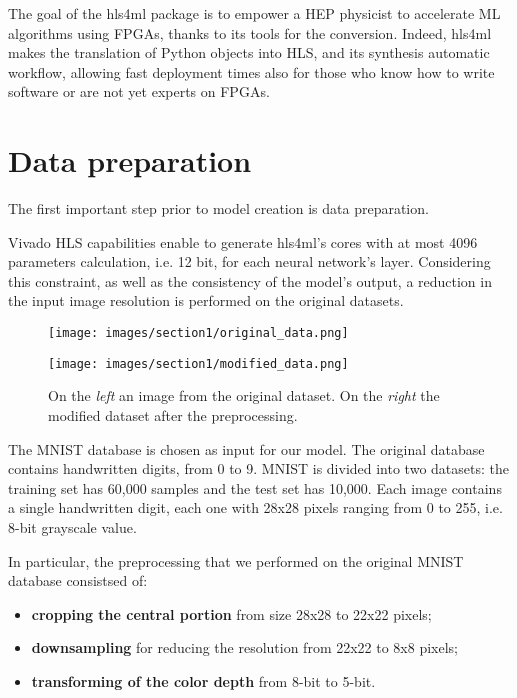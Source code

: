 \documentclass{article}
\begin{document}
\par The goal of the hls4ml package is to empower a HEP physicist to accelerate
ML algorithms using FPGAs, thanks to its tools for the conversion. 
Indeed, hls4ml makes the translation of Python objects into HLS, and its
synthesis automatic workflow, allowing fast deployment times also for
those who know how to write software or are not yet experts on FPGAs.




\section{Data preparation}
The first important step prior to model creation is data preparation.
\par Vivado HLS capabilities enable to generate hls4ml's cores with 
at most 4096 parameters calculation, i.e. 12 bit, for each neural network's layer. 
Considering this constraint, as well as the consistency of the model's output,
a reduction in the input image resolution is performed on the original datasets. 

\begin{figure}[H]
  \centering
  \begin{minipage}[c]{.4\textwidth}
   {\texttt{[image: images/section1/original\_data.png]}}
    \end{minipage}
    \qquad \qquad
      \begin{minipage}[c]{0.4\textwidth}
  {\texttt{[image: images/section1/modified\_data.png]}}
     \end{minipage}
     \quad
     
   \caption{On the \textit{left} an image from the original dataset.
   On the \textit{right} the modified dataset after the preprocessing.}
    \label{fig:MNIST}
\end{figure}

\par The MNIST database is chosen as input for our model.
The original database contains handwritten digits, from 0 to 9. 
MNIST is divided into two datasets: the training set has 60,000 samples and the test set has 10,000.
Each image contains a single handwritten digit, each one with 28x28 pixels 
ranging from 0 to 255, i.e. 8-bit grayscale value.
\par In particular, the preprocessing that we performed on the original MNIST database consistsed of:
\begin{itemize}
    \item \textbf{cropping the central portion} from size 28x28 to 22x22 pixels;
    \item \textbf{downsampling} for reducing the resolution from 22x22 to 8x8 pixels;
    \item \textbf{transforming of the color depth} from 8-bit to 5-bit.
\end{itemize}
\end{document}
